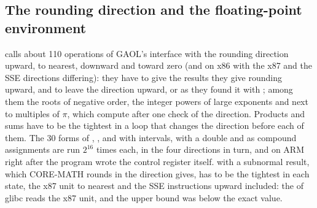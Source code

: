\documentclass[12pt,a4paper,twoside,openright]{book}
\begin{document}
\subsection{The rounding direction and the floating-point environment}

 calls about 110 operations of GAOL's interface
with the rounding direction upward, to nearest, downward and toward zero
(and on x86 with the x87 and the SSE directions differing): they have to
give the results they give rounding upward, and to leave the direction
upward, or as they found it with ; among
them the roots of negative order, the integer powers of large exponents and
 next to multiples of $\pi$, which compute after one
check of the direction.\newinvfive{} Products and sums have to be the
tightest in a loop that changes the direction before each of them. The 30
forms of \code{+ - * / \%}, ,  and 
with intervals, with a double and as compound assignments are run $2^{16}$
times each, in the four directions in turn, and on ARM right after the
program wrote the control register itself.  with a subnormal
result, which CORE-MATH rounds in the direction  gives,
has to be the tightest in each state, the x87 unit to nearest and the SSE
instructions upward included: the  of glibc reads the x87
unit, and the upper bound was below the exact value.\newinvfive
\end{document}
